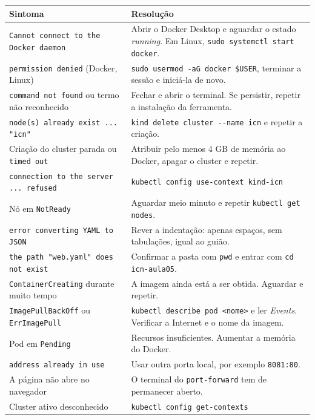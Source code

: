 \documentclass[11pt,a4paper]{article}
\newcommand{\cmd}[1]{\texttt{#1}}
\begin{document}
\renewcommand{\arraystretch}{1.7}
\begin{center}
\small
\begin{tabular}{>{\raggedright\arraybackslash}p{5.6cm} >{\raggedright\arraybackslash}p{9.2cm}}
\toprule
\textbf{Sintoma} & \textbf{Resolução} \\
\midrule
\cmd{Cannot connect to the Docker daemon} & Abrir o Docker Desktop e aguardar o estado \emph{running}. Em Linux, \cmd{sudo systemctl start docker}. \\
\cmd{permission denied} (Docker, Linux) & \cmd{sudo usermod -aG docker \$USER}, terminar a sessão e iniciá-la de novo. \\
\cmd{command not found} ou termo não reconhecido & Fechar e abrir o terminal. Se persistir, repetir a instalação da ferramenta. \\
\cmd{node(s) already exist ... "icn"} & \cmd{kind delete cluster -{}-name icn} e repetir a criação. \\
Criação do cluster parada ou \cmd{timed out} & Atribuir pelo menos 4 GB de memória ao Docker, apagar o cluster e repetir. \\
\cmd{connection to the server ... refused} & \cmd{kubectl config use-context kind-icn} \\
Nó em \cmd{NotReady} & Aguardar meio minuto e repetir \cmd{kubectl get nodes}. \\
\cmd{error converting YAML to JSON} & Rever a indentação: apenas espaços, sem tabulações, igual ao guião. \\
\cmd{the path "web.yaml" does not exist} & Confirmar a pasta com \cmd{pwd} e entrar com \cmd{cd icn-aula05}. \\
\cmd{ContainerCreating} durante muito tempo & A imagem ainda está a ser obtida. Aguardar e repetir. \\
\cmd{ImagePullBackOff} ou \cmd{ErrImagePull} & \cmd{kubectl describe pod <nome>} e ler \emph{Events}. Verificar a Internet e o nome da imagem. \\
Pod em \cmd{Pending} & Recursos insuficientes. Aumentar a memória do Docker. \\
\cmd{address already in use} & Usar outra porta local, por exemplo \cmd{8081:80}. \\
A página não abre no navegador & O terminal do \cmd{port-forward} tem de permanecer aberto. \\
Cluster ativo desconhecido & \cmd{kubectl config get-contexts} \\
\bottomrule
\end{tabular}
\end{center}
\end{document}
